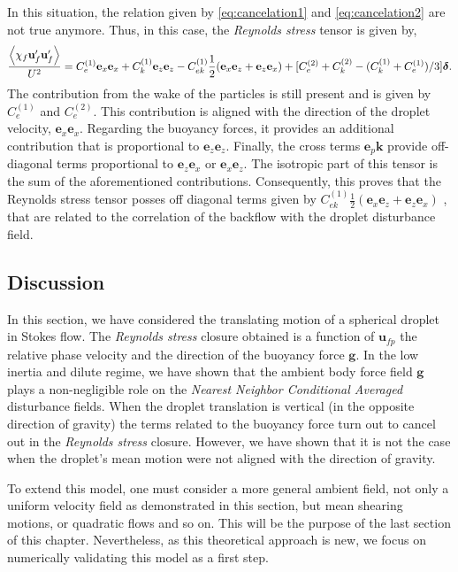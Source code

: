 In this situation, the relation given by \ref{eq:cancelation1} and \ref{eq:cancelation2} are not true anymore. 
Thus, in this case, the \textit{Reynolds stress} tensor is given by, 
\begin{equation}
    \frac{\left<\chi_f \textbf{u}_f'\textbf{u}_f'\right>}{U^2}
    = 
    C^{(1)}_e 
    \textbf{e}_x\textbf{e}_x
    +C^{(1)}_k    
    \textbf{e}_z\textbf{e}_z
    - C^{(1)}_{ek} 
        \frac{1}{2}
        (\textbf{e}_x\textbf{e}_z+ \textbf{e}_z \textbf{e}_x)
    + [C^{(2)}_e + C^{(2)}_k - (C^{(1)}_k + C^{(1)}_e )/3 ]  \bm\delta. 
\end{equation}
The contribution from the wake of the particles is still present and is given by $C_e^{(1)}$ and $C_e^{(2)}$. 
This contribution is aligned with the direction of the droplet velocity, $\textbf{e}_x\textbf{e}_x$. 
Regarding the buoyancy forces, it provides an additional contribution that is proportional to $\textbf{e}_z\textbf{e}_z$. 
Finally, the cross terms $\textbf{e}_p \textbf{k}$ provide off-diagonal terms proportional to $\textbf{e}_z \textbf{e}_x$ or $\textbf{e}_x \textbf{e}_z$. 
The isotropic part of this tensor is the sum of the aforementioned contributions. 
Consequently, this proves that the Reynolds stress tensor posses off diagonal terms given by $C^{(1)}_{ek} 
\frac{1}{2} (\textbf{e}_x\textbf{e}_z+ \textbf{e}_z \textbf{e}_x)$ , that are related to the correlation of the backflow with the droplet disturbance field. 

\subsection{Discussion}

In this section, we have considered the translating motion of a spherical droplet in Stokes flow. 
The \textit{Reynolds stress} closure obtained is a function of $\textbf{u}_{fp}$ the relative phase velocity and the direction of the buoyancy force $\textbf{g}$. 
In the low inertia and dilute regime, we have shown that the ambient body force field $\textbf{g}$ plays a non-negligible role on the \textit{Nearest Neighbor Conditional Averaged} disturbance fields.
When the droplet translation is vertical (in the opposite direction of gravity) the terms related to the buoyancy force turn out to cancel out in the \textit{Reynolds stress} closure.
However, we have shown that it is not the case when the droplet's mean motion were not aligned with the direction of gravity.  

To extend this model, one must consider a more general ambient field, not only a uniform velocity field as demonstrated in this section, but mean shearing motions, or quadratic flows and so on. 
This will be the purpose of the last section of this chapter. 
Nevertheless, as this theoretical approach is new, we focus on numerically validating this model as a first step. 
